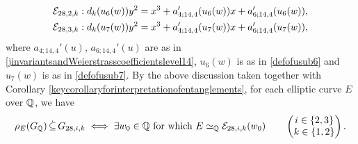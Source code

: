 \[
\begin{split}
&\mathcal{E}_{28,2,k} : d_k(u_6(w)) y^2 = x^3 + a_{4;14,4}'(u_6(w)) x + a_{6;14,4}'(u_6(w)), \\
&\mathcal{E}_{28,3,k} : d_k(u_7(w)) y^2 = x^3 + a_{4;14,4}'(u_7(w)) x + a_{6;14,4}'(u_7(w)),
\end{split}
\]
where $a_{4;14,4}'(u)$, $a_{6;14,4}'(u)$ are as in \eqref{jinvariantsandWeierstrasscoefficientslevel14}, $u_6(w)$ is as in \eqref{defofusub6} and $u_7(w)$ is as in \eqref{defofusub7}. By the above discussion taken together with Corollary \ref{keycorollaryforinterpretationofentanglements}, for each elliptic curve $E$ over $\mathbb{Q}$, we have
\[
\rho_E(G_{\mathbb{Q}}) \, \dot\subseteq \, G_{28,i,k} \; \Longleftrightarrow \; \exists w_0 \in \mathbb{Q} \text{ for which } E \simeq_{\mathbb{Q}} \mathcal{E}_{28,i,k}(w_0) \quad\quad \begin{pmatrix} i \in \{ 2, 3 \} \\ k \in \{ 1, 2 \} \end{pmatrix}.
\]

